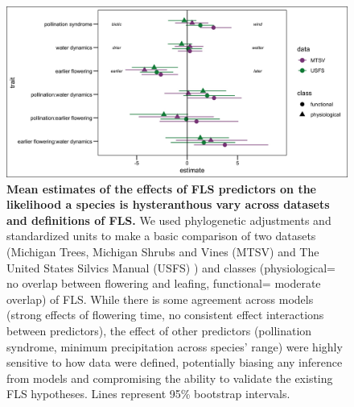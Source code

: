 \documentclass[11pt]{article}\usepackage[]{graphicx}\usepackage[]{color}
\begin{document}
\begin{figure}[H]
    \centering
 \includegraphics[width=\textwidth]{..//..//MTSV_USFS/MTSV_USFS.jpeg} 
    \caption{\textbf{Mean estimates of the effects of FLS predictors on the likelihood a species is hysteranthous vary across datasets and definitions of FLS.}  We used phylogenetic adjustments and standardized units to make a basic comparison of two datasets (Michigan Trees, Michigan Shrubs and Vines (MTSV) \citep{Barnes2004,Barnes2016} and The United States Silvics Manual (USFS) \citep{Burns1990}) and classes (physiological= no overlap between flowering and leafing, functional= moderate overlap) of FLS. While there is some agreement across models (strong effects of flowering time, no consistent effect interactions between predictors), the effect of other predictors (pollination syndrome, minimum precipitation across species' range) were highly sensitive to how data were defined, potentially biasing any inference from models and compromising the ability to validate the existing FLS hypotheses. Lines represent 95\% bootstrap intervals.}
    \label{fig:muplots.USMT}
\end{figure}
\end{document}
